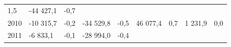 \begin{longtable}[]{@{}lllllllll@{}}
\begin{minipage}[t]{0.06\columnwidth}
1,5\strut
\end{minipage} & \begin{minipage}[t]{0.08\columnwidth}\raggedright
-44 427,1\strut
\end{minipage} & \begin{minipage}[t]{0.06\columnwidth}\raggedright
-0,7\strut
\end{minipage}\tabularnewline
\begin{minipage}[t]{0.05\columnwidth}\raggedright
2010\strut
\end{minipage} & \begin{minipage}[t]{0.10\columnwidth}\raggedright
-10 315,7\strut
\end{minipage} & \begin{minipage}[t]{0.06\columnwidth}\raggedright
-0,2\strut
\end{minipage} & \begin{minipage}[t]{0.17\columnwidth}\raggedright
-34 529,8\strut
\end{minipage} & \begin{minipage}[t]{0.06\columnwidth}\raggedright
-0,5\strut
\end{minipage} & \begin{minipage}[t]{0.12\columnwidth}\raggedright
46 077,4\strut
\end{minipage} & \begin{minipage}[t]{0.06\columnwidth}\raggedright
0,7\strut
\end{minipage} & \begin{minipage}[t]{0.08\columnwidth}\raggedright
1 231,9\strut
\end{minipage} & \begin{minipage}[t]{0.06\columnwidth}\raggedright
0,0\strut
\end{minipage}\tabularnewline
\begin{minipage}[t]{0.05\columnwidth}\raggedright
2011\strut
\end{minipage} & \begin{minipage}[t]{0.10\columnwidth}\raggedright
-6 833,1\strut
\end{minipage} & \begin{minipage}[t]{0.06\columnwidth}\raggedright
-0,1\strut
\end{minipage} & \begin{minipage}[t]{0.17\columnwidth}\raggedright
-28 994,0\strut
\end{minipage} & \begin{minipage}[t]{0.06\columnwidth}\raggedright
-0,4\strut
\end{minipage} & \begin{minipage}[t]{0.12\columnwidth}\raggedright

\end{minipage}
\end{longtable}
